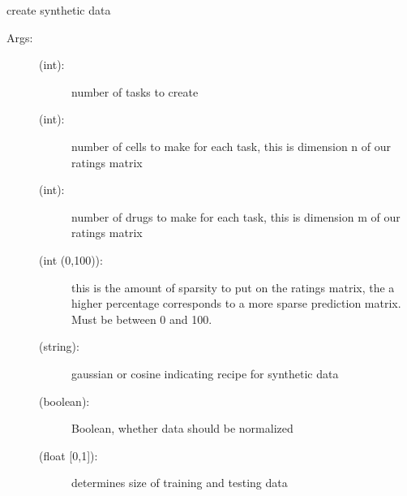 \documentclass[letterpaper,10pt,english,openany,oneside]{sphinxmanual}
\begin{document}
\begin{fulllineitems}
\label{\detokenize{data:datasets.SyntheticData.SyntheticDataCreator}}
create synthetic data
\begin{description}
\item[{Args:}] \leavevmode\begin{description}
\item[{ (int): }] \leavevmode
number of tasks to create

\item[{ (int): }] \leavevmode
number of cells to make for each task, this is dimension n of our ratings matrix

\item[{ (int): }] \leavevmode
number of drugs to make for each task, this is dimension m of our ratings matrix

\item[{ (int (0,100)): }] \leavevmode
this is the amount of sparsity to put on the ratings matrix, the a higher percentage corresponds to a more sparse prediction matrix. Must be between 0 and 100.

\item[{ (string): }] \leavevmode
gaussian or cosine indicating recipe for synthetic data

\item[{ (boolean):}] \leavevmode
Boolean, whether data should be normalized

\item[{ (float {[}0,1{]}): }] \leavevmode
determines size of training and testing data


\end{description}
\end{description}
\end{fulllineitems}
\end{document}

